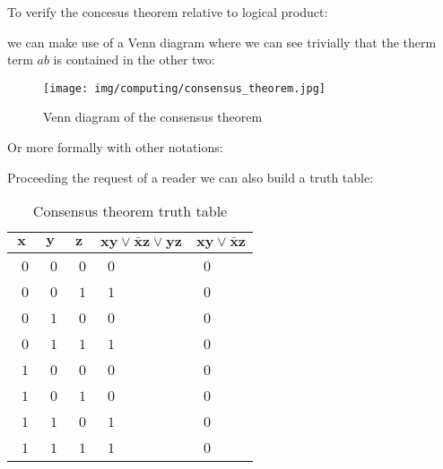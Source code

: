	\begin{dem}
	To verify the concesus theorem relative to logical product:
	
	we can make use of a Venn diagram where we can see trivially that the therm term $ab$ is contained in the other two:
	\begin{figure}[H]
		\centering
		\texttt{[image: img/computing/consensus\_theorem.jpg]}
		\caption{Venn diagram of the consensus theorem}
	\end{figure}
	Or more formally with other notations:
	
	Proceeding the request of a reader we can also build a truth table:
	\begin{table}[H]
		\begin{center}
				\begin{tabular}{|p{2cm}|p{2cm}|p{2cm}|p{2cm}|p{2cm}|}
					\hline
					\multicolumn{1}{c}{\cellcolor{black!30}$\pmb{x}$} & 
	  \multicolumn{1}{c}{\cellcolor{black!30}$\pmb{y}$}  & \multicolumn{1}{c}{\cellcolor{black!30}$\pmb{z}$} & \multicolumn{1}{c}{\cellcolor{black!30}$\pmb{xy \vee \bar{x}z \vee yz}$} & \multicolumn{1}{c}{\cellcolor{black!30}$\pmb{xy \vee \bar{x}z}$} \\ \hline
					\centering\arraybackslash\ $0$ & \centering\arraybackslash\ $0$ & \centering\arraybackslash\ $0$ & \centering\arraybackslash\ $0$ & \centering\arraybackslash\ $0$ \\ \hline
					\centering\arraybackslash\ $0$ & \centering\arraybackslash\ $0$ & \centering\arraybackslash\ $1$ & \centering\arraybackslash\ $1$ & \centering\arraybackslash\ $0$ \\ \hline
					\centering\arraybackslash\ $0$ & \centering\arraybackslash\ $1$ & \centering\arraybackslash\ $0$ & \centering\arraybackslash\ $0$ & \centering\arraybackslash\ $0$ \\ \hline
					\centering\arraybackslash\ $0$ & \centering\arraybackslash\ $1$ & \centering\arraybackslash\ $1$ & \centering\arraybackslash\ $1$ & \centering\arraybackslash\ $0$ \\ \hline
					\centering\arraybackslash\ $1$ & \centering\arraybackslash\ $0$ & \centering\arraybackslash\ $0$ & \centering\arraybackslash\ $0$ & \centering\arraybackslash\ $0$ \\ \hline
					\centering\arraybackslash\ $1$ & \centering\arraybackslash\ $0$ & \centering\arraybackslash\ $1$ & \centering\arraybackslash\ $0$ & \centering\arraybackslash\ $0$ \\ \hline
					\centering\arraybackslash\ $1$ & \centering\arraybackslash\ $1$ & \centering\arraybackslash\ $0$ & \centering\arraybackslash\ $1$ & \centering\arraybackslash\ $0$ \\ \hline
					\centering\arraybackslash\ $1$ & \centering\arraybackslash\ $1$ & \centering\arraybackslash\ $1$ & \centering\arraybackslash\ $1$ & \centering\arraybackslash\ $0$  \\ \hline
			\end{tabular}
		\end{center}
		\caption{Consensus theorem truth table}
		\end{table}
		

\end{dem}
